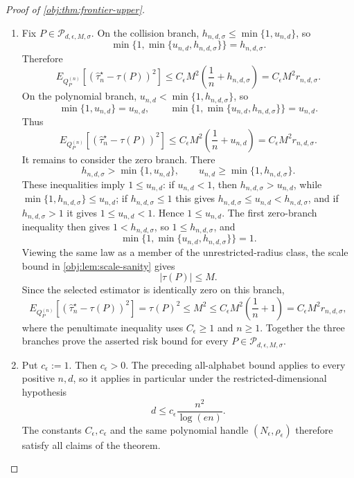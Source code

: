 \begin{proof}[Proof of \cref{obj:thm:frontier-upper}]
\begin{enumerate}
\item Fix \(P\in\mathcal P_{d,\epsilon,M,\sigma}\).  On the collision branch,
\(h_{n,d,\sigma}\le \min\{1,u_{n,d}\}\), so
\[
\min\{1,\min\{u_{n,d},h_{n,d,\sigma}\}\}=h_{n,d,\sigma}.
\]
Therefore
\[
E_{Q_P^{(n)}}\!\left[
\left(\widehat\tau_n^{\star}-\tau(P)\right)^2
\right]
\le
C_{\epsilon}M^2\left(\frac1n+h_{n,d,\sigma}\right)
=
C_{\epsilon}M^2 r_{n,d,\sigma}.
\]
On the polynomial branch, \(u_{n,d}<\min\{1,h_{n,d,\sigma}\}\), so
\[
\min\{1,u_{n,d}\}=u_{n,d},
\qquad
\min\{1,\min\{u_{n,d},h_{n,d,\sigma}\}\}=u_{n,d}.
\]
Thus
\[
E_{Q_P^{(n)}}\!\left[
\left(\widehat\tau_n^{\star}-\tau(P)\right)^2
\right]
\le
C_{\epsilon}M^2\left(\frac1n+u_{n,d}\right)
=
C_{\epsilon}M^2 r_{n,d,\sigma}.
\]
It remains to consider the zero branch.  There
\[
h_{n,d,\sigma}> \min\{1,u_{n,d}\},
\qquad
u_{n,d}\ge \min\{1,h_{n,d,\sigma}\}.
\]
These inequalities imply \(1\le u_{n,d}\): if \(u_{n,d}<1\), then
\(h_{n,d,\sigma}>u_{n,d}\), while
\(\min\{1,h_{n,d,\sigma}\}\le u_{n,d}\); if \(h_{n,d,\sigma}\le1\) this gives
\(h_{n,d,\sigma}\le u_{n,d}<h_{n,d,\sigma}\), and if \(h_{n,d,\sigma}>1\) it
gives \(1\le u_{n,d}<1\).  Hence \(1\le u_{n,d}\).  The first zero-branch
inequality then gives \(1<h_{n,d,\sigma}\), so \(1\le h_{n,d,\sigma}\), and
\[
\min\{1,\min\{u_{n,d},h_{n,d,\sigma}\}\}=1.
\]
Viewing the same law as a member of the unrestricted-radius class, the scale
bound in \cref{obj:lem:scale-sanity} gives
\[
|\tau(P)|\le M.
\]
Since the selected estimator is identically zero on this branch,
\[
E_{Q_P^{(n)}}\!\left[
\left(\widehat\tau_n^{\star}-\tau(P)\right)^2
\right]
=
\tau(P)^2
\le M^2
\le C_{\epsilon}M^2\left(\frac1n+1\right)
=
C_{\epsilon}M^2 r_{n,d,\sigma},
\]
where the penultimate inequality uses \(C_{\epsilon}\ge1\) and \(n\ge1\).
Together the three branches prove the asserted risk bound for every
\(P\in\mathcal P_{d,\epsilon,M,\sigma}\). %

\item Put \(c_{\epsilon}:=1\).  Then \(c_{\epsilon}>0\).  The preceding
all-alphabet bound applies to every positive \(n,d\), so it applies in
particular under the restricted-dimensional hypothesis
\[
d\le c_{\epsilon}\frac{n^2}{\log(en)}.
\]
The constants \(C_{\epsilon},c_{\epsilon}\) and the same polynomial handle
\((N_{\epsilon},\rho_{\epsilon})\) therefore satisfy all claims of the theorem.
\end{enumerate}
\end{proof}

